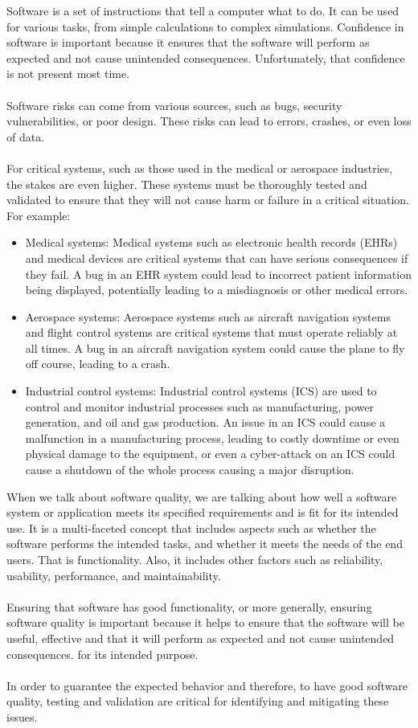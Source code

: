 \documentclass{report}
\theoremstyle{definition}
\theoremstyle{definition}
\begin{document}
Software is a set of instructions that tell a computer what to do. It can be used for various tasks, from simple calculations to complex simulations. Confidence in software is important because it ensures that the software will perform as expected and not cause unintended consequences. Unfortunately, that confidence is not present most time.\\\\
Software risks can come from various sources, such as bugs, security vulnerabilities, or poor design. These risks can lead to errors, crashes, or even loss of data.\\\\
For critical systems, such as those used in the medical or aerospace industries, the stakes are even higher. These systems must be thoroughly tested and validated to ensure that they will not cause harm or failure in a critical situation. For example:
\begin{itemize}
	\item Medical systems: Medical systems such as electronic health records (EHRs) and medical devices are critical systems that can have serious consequences if they fail. A bug in an EHR system could lead to incorrect patient information being displayed, potentially leading to a misdiagnosis or other medical errors.
	\item Aerospace systems: Aerospace systems such as aircraft navigation systems and flight control systems are critical systems that must operate reliably at all times. A bug in an aircraft navigation system could cause the plane to fly off course, leading to a crash.
	\item Industrial control systems: Industrial control systems (ICS) are used to control and monitor industrial processes such as manufacturing, power generation, and oil and gas production. An issue in an ICS could cause a malfunction in a manufacturing process, leading to costly downtime or even physical damage to the equipment, or even a cyber-attack on an ICS could cause a shutdown of the whole process causing a major disruption.
\end{itemize}
When we talk about software quality, we are talking about how well a software system or application meets its specified requirements and is fit for its intended use. It is a multi-faceted concept that includes aspects such as whether the software performs the intended tasks, and whether it meets the needs of the end users. That is functionality. Also, it includes other factors such as reliability, usability, performance, and maintainability.\\\\
Ensuring that software has good functionality, or more generally, ensuring software quality is important because it helps to ensure that the software will be useful, effective and that it will perform as expected and not cause unintended consequences. for its intended purpose.\\\\
In order to guarantee the expected behavior and therefore, to have good software quality, testing and validation are critical for identifying and mitigating these issues.
%
\pagebreak
%
\end{document}
